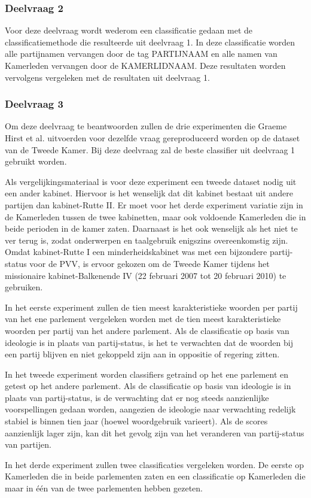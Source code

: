 \subsubsection{Deelvraag 2}

Voor deze deelvraag wordt wederom een classificatie gedaan met de classificatiemethode die resulteerde uit deelvraag 1. In deze classificatie worden alle partijnamen vervangen door de tag PARTIJNAAM en alle namen van Kamerleden vervangen door de KAMERLIDNAAM. Deze resultaten worden vervolgens vergeleken met de resultaten uit deelvraag 1. 

\subsubsection{Deelvraag 3}

Om deze deelvraag te beantwoorden zullen de drie experimenten die Graeme Hirst et al. uitvoerden voor dezelfde vraag gereproduceerd worden op de dataset van de Tweede Kamer. Bij deze deelvraag zal de beste classifier uit deelvraag 1 gebruikt worden. \par
Als vergelijkingsmateriaal is voor deze experiment een tweede dataset nodig uit een ander kabinet. Hiervoor is het wenselijk dat dit kabinet bestaat uit andere partijen dan kabinet-Rutte II. Er moet voor het derde experiment variatie zijn in de Kamerleden tussen de twee kabinetten, maar ook voldoende Kamerleden die in beide perioden in de kamer zaten. Daarnaast is het ook wenselijk als het niet te ver terug is, zodat onderwerpen en taalgebruik enigszins overeenkomstig zijn. Omdat kabinet-Rutte I een minderheidskabinet was met een bijzondere partij-status voor de PVV, is ervoor gekozen om de Tweede Kamer tijdens het missionaire kabinet-Balkenende IV (22 februari 2007 tot 20 februari 2010) te gebruiken.\par
In het eerste experiment zullen de tien meest karakteristieke woorden per partij van het ene parlement vergeleken worden met de tien meest karakteristieke woorden per partij van het andere parlement. Als de classificatie op basis van ideologie is in plaats van partij-status, is het te verwachten dat de woorden bij een partij blijven en niet gekoppeld zijn aan in oppositie of regering zitten. \par
In het tweede experiment worden classifiers getraind op het ene parlement en getest op het andere parlement. Als de classificatie op basis van ideologie is in plaats van partij-status, is de verwachting dat er nog steeds aanzienlijke voorspellingen gedaan worden, aangezien de ideologie naar verwachting redelijk stabiel is binnen tien jaar (hoewel woordgebruik varieert). Als de scores aanzienlijk lager zijn, kan dit het gevolg zijn van het veranderen van partij-status van partijen.\par
In het derde experiment zullen twee classificaties vergeleken worden. De eerste op Kamerleden die in beide parlementen zaten en een classificatie op Kamerleden die maar in één van de twee parlementen hebben gezeten.\par
